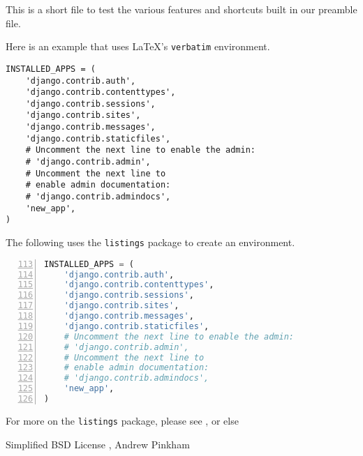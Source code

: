 






This is a short file to test the various features and shortcuts built in our preamble file.


Here is an example that uses \LaTeX 's \verb|verbatim| environment.
\begin{verbatim}
INSTALLED_APPS = (
    'django.contrib.auth',
    'django.contrib.contenttypes',
    'django.contrib.sessions',
    'django.contrib.sites',
    'django.contrib.messages',
    'django.contrib.staticfiles',
    # Uncomment the next line to enable the admin:
    # 'django.contrib.admin',
    # Uncomment the next line to
    # enable admin documentation:
    # 'django.contrib.admindocs',
    'new_app',
)
\end{verbatim}

The following uses the \verb|listings| package to create an environment.

\begin{lstlisting}[basicstyle=\ttfamily,%
                   caption={Django's Installed Apps in settings.py},%
                   columns=fixed,%
                   frame=single,%
                   firstnumber=113,%
                   label=code:django:installed_apps,%
                   language=Python,%
                   numbers=left]
INSTALLED_APPS = (
    'django.contrib.auth',
    'django.contrib.contenttypes',
    'django.contrib.sessions',
    'django.contrib.sites',
    'django.contrib.messages',
    'django.contrib.staticfiles',
    # Uncomment the next line to enable the admin:
    # 'django.contrib.admin',
    # Uncomment the next line to
    # enable admin documentation:
    # 'django.contrib.admindocs',
    'new_app',
)
\end{lstlisting}

For more on the \verb|listings| package, please see , or else 

Simplified BSD License , Andrew Pinkham


